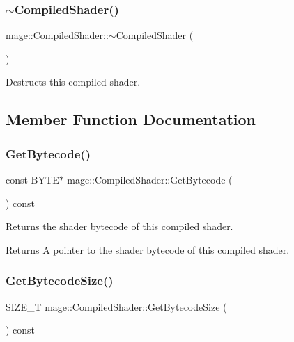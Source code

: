 \subsubsection{\texorpdfstring{$\sim$\+Compiled\+Shader()}{~CompiledShader()}}
{\footnotesize\ttfamily mage\+::\+Compiled\+Shader\+::$\sim$\+Compiled\+Shader (\begin{DoxyParamCaption}{ }\end{DoxyParamCaption})\hspace{0.3cm}{\ttfamily [default]}}

Destructs this compiled shader. 

\subsection{Member Function Documentation}
\hypertarget{structmage_1_1_compiled_shader_a9de640fa51575dc77183d0864b4e8c42}{}\label{structmage_1_1_compiled_shader_a9de640fa51575dc77183d0864b4e8c42} 
\subsubsection{\texorpdfstring{Get\+Bytecode()}{GetBytecode()}}
{\footnotesize\ttfamily const B\+Y\+TE$\ast$ mage\+::\+Compiled\+Shader\+::\+Get\+Bytecode (\begin{DoxyParamCaption}{ }\end{DoxyParamCaption}) const\hspace{0.3cm}{\ttfamily [noexcept]}}

Returns the shader bytecode of this compiled shader.

\begin{DoxyReturn}{Returns}
A pointer to the shader bytecode of this compiled shader. 
\end{DoxyReturn}
\hypertarget{structmage_1_1_compiled_shader_a17df0554eb82bdbc24505c4c5d2b14da}{}\label{structmage_1_1_compiled_shader_a17df0554eb82bdbc24505c4c5d2b14da} 
\subsubsection{\texorpdfstring{Get\+Bytecode\+Size()}{GetBytecodeSize()}}
{\footnotesize\ttfamily S\+I\+Z\+E\+\_\+T mage\+::\+Compiled\+Shader\+::\+Get\+Bytecode\+Size (\begin{DoxyParamCaption}{ }\end{DoxyParamCaption}) const\hspace{0.3cm}{\ttfamily [noexcept]}}


